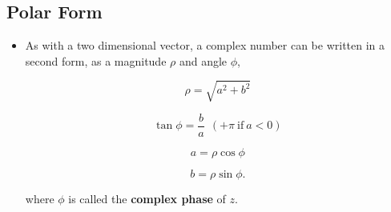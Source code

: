 \documentclass[12pt]{article}
\begin{document}
\subsection*{Polar Form}
\begin{itemize}
\item As with a two dimensional vector, a complex number can be
  written in a second form, as a magnitude $\rho$ and angle $\phi$,

  \begin{equation}
    \rho = \sqrt{a^2 + b^2}
  \end{equation}
  
  \begin{equation}
    \tan \phi = \frac{b}{a} ~~(+ \pi~\mathrm{if}~a<0)
  \end{equation}
  
  \begin{equation}
    a = \rho \cos \phi
  \end{equation}
  
  \begin{equation}
    b = \rho \sin \phi.
  \end{equation}

  \noindent
  where $\phi$ is called the \textbf{complex phase} of $z$.

\end{itemize}
\end{document}
